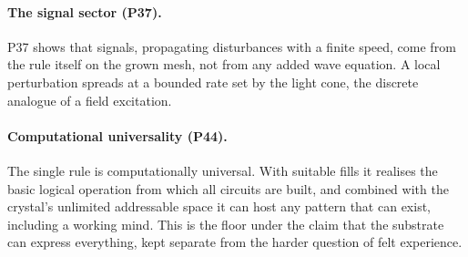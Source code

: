 \paragraph{The signal sector (P37).}
P37 shows that signals, propagating disturbances with a finite speed, come from the rule itself on
the grown mesh, not from any added wave equation. A local perturbation spreads at a bounded rate set
by the light cone, the discrete analogue of a field excitation.

\paragraph{Computational universality (P44).}
The single rule is computationally universal. With suitable fills it realises the basic logical
operation from which all circuits are built, and combined with the crystal's unlimited addressable
space it can host any pattern that can exist, including a working mind. This is the floor under the
claim that the substrate can express everything, kept separate from the harder question of felt
experience.
